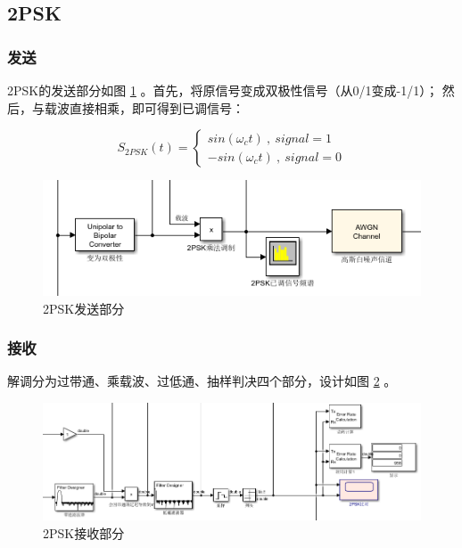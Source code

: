 \documentclass[11pt]{paper}
\begin{document}
\subsection{2PSK}

\subsubsection{发送}

2PSK的发送部分如图 \ref{2PSK发送部分} 。首先，将原信号变成双极性信号（从0/1变成-1/1）；
然后，与载波直接相乘，即可得到已调信号：

$$
    S_{2PSK}(t)=
    \begin{cases}
        sin(\omega _{c}t)\ ,\ signal=1 \\
        -sin(\omega _{c}t)\ ,\ signal=0
    \end{cases}
$$

\begin{figure}[ht]
    \centering
    \includegraphics[width=5.9in]{texture/design/2psk1.png}
    \caption{2PSK发送部分}
    \label{2PSK发送部分}
\end{figure}

\subsubsection{接收}

解调分为过带通、乘载波、过低通、抽样判决四个部分，设计如图 \ref{2PSK接收部分} 。

\begin{figure}[ht]
    \centering
    \includegraphics[width=5.9in]{texture/design/2psk2.png}
    \caption{2PSK接收部分}
    \label{2PSK接收部分}
\end{figure}
\end{document}
